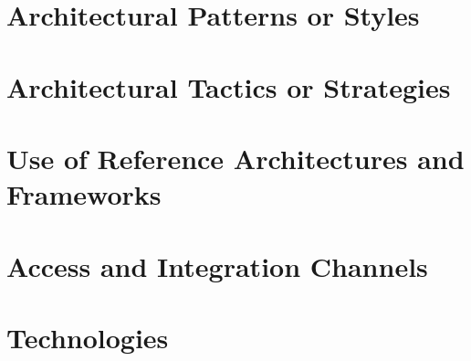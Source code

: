 \documentclass[11pt,a4paper,titlepage]{article}
\begin{document}
\section{Architectural Patterns or Styles}
	

\section{Architectural Tactics or Strategies}

\section{Use of Reference Architectures and Frameworks}

\section{Access and Integration Channels}

\section{Technologies}

	
\end{document}
